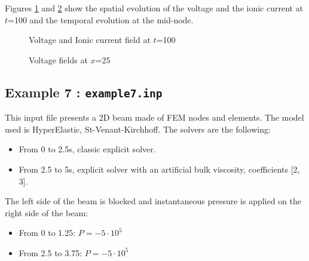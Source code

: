 \documentclass[oneside,11pt,times]{book}
\begin{document}
Figures \ref{fig:ex6spat} and \ref{fig:ex6temp} show the spatial evolution of the voltage and the ionic current at $t$=100 and the temporal evolution at the mid-node.

\begin{figure}[h!]
    \centering
	\caption{Voltage and Ionic current field at $t$=100}
    \label{fig:ex6spat}
\end{figure}

\begin{figure}[h!]
    \centering
	\caption{Voltage fields at $x$=25}
    \label{fig:ex6temp}
\end{figure}

\subsection{Example 7 : \texttt{example7.inp}}
This input file presents a 2D beam made of FEM nodes and elements. The model used is HyperElastic, St-Venant-Kirchhoff. The solvers are the following:
\begin{itemize}
    \item From 0 to 2.5s, classic explicit solver.
    \item From 2.5 to 5s, explicit solver with an artificial bulk viscosity, coefficients [2, 3].
\end{itemize}
The left side of the beam is blocked and instantaneous pressure is applied on the right side of the beam:
\begin{itemize}
    \item From 0 to 1.25: $P=-5\cdot10^{5}$
    \item From 2.5 to 3.75: $P=-5\cdot10^{5}$
\end{itemize}
\end{document}
